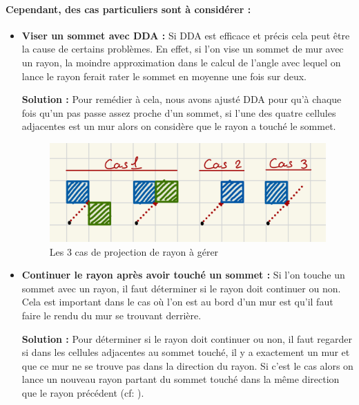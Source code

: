 \documentclass[11pt]{article}
\begin{document}
\paragraph{Cependant, des cas particuliers sont à considérer :}
\begin{itemize}
	\item \textbf{Viser un sommet avec DDA : } Si DDA est efficace et précis cela peut être la cause de certains problèmes. 
	En effet, si l'on vise un sommet de mur avec un rayon, la moindre approximation dans le calcul de l'angle avec lequel on 
	lance le rayon ferait rater le sommet en moyenne une fois sur deux.

	\textbf{Solution : }Pour remédier à cela, nous avons ajusté DDA pour qu'à chaque fois qu'un pas
	passe assez proche d'un sommet, si l'une des quatre cellules adjacentes est
	un mur alors on considère que le rayon a touché le sommet.

	\begin{figure}
		\center\begin{minipage}{\textwidth}
			\center\includegraphics[width=\linewidth]{image/3cas-dda.jpeg}
			\caption{Les 3 cas de projection de rayon à gérer}
			\label{fig:3cas-dda}
		\end{minipage}
	\end{figure}

	\item \textbf{Continuer le rayon après avoir touché un sommet :} Si l'on touche un sommet avec 
	un rayon, il faut déterminer si le rayon doit continuer ou non. Cela est important dans le cas où l'on 
	est au bord d'un mur est qu'il faut faire le rendu du mur se trouvant derrière.

	\textbf{Solution : }Pour déterminer si le rayon doit continuer ou non, il faut regarder si
	dans les cellules adjacentes au sommet touché, il y a exactement un mur et que ce mur
	ne se trouve pas dans la direction du rayon. Si c'est le cas alors on lance un nouveau rayon 
	partant du sommet touché dans la même direction que le rayon précédent (cf: ).


\end{itemize}
\end{document}
